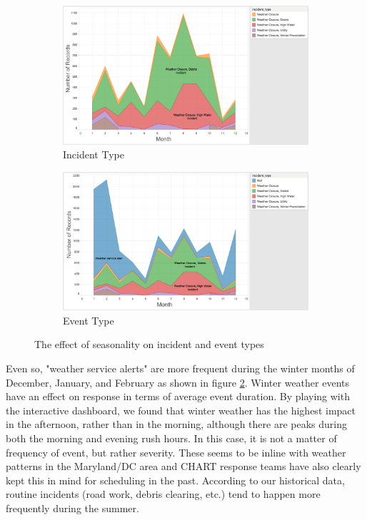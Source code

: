 \documentclass[11pt,letterpaper]{article}
\begin{document}
\begin{figure}[h]
	\centering
	\begin{subfigure}{0.49\textwidth}
		\centering
		\includegraphics[width=\textwidth]{figures/weather.png}
    	\caption{\textsf{Incident Type}}
	    \label{fig:weather}
	\end{subfigure} \hfill
	\begin{subfigure}{0.49\textwidth}
		\centering
		\includegraphics[width=\textwidth]{figures/weather_event.png}
		\caption{Event Type}
        \label{fig:weather_event}
	\end{subfigure}
    \caption{\textsf{The effect of seasonality on incident and event types}}
    \label{fig:weather_types}
\end{figure}

Even so, "weather service alerts" are more frequent during the winter months of December, January, and February as shown in figure \ref{fig:weather_event}. Winter weather events have an effect on response in terms of average event duration. By playing with the interactive dashboard, we found that winter weather has the highest impact in the afternoon, rather than in the morning, although there are peaks during both the morning and evening rush hours. In this case, it is not a matter of frequency of event, but rather severity. These seems to be inline with weather patterns in the Maryland/DC area and CHART response teams have also clearly kept this in mind for scheduling in the past. According to our historical data, routine incidents (road work, debris clearing, etc.) tend to happen more frequently during the summer. 
\end{document}
